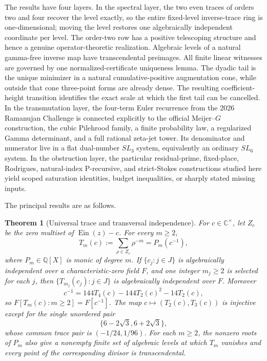 \documentclass[11pt]{article}
\theoremstyle{keio}
\newtheorem{theorem}{Theorem}[section]
\theoremstyle{definition}
\theoremstyle{remark}
\newcommand{\Q}{\mathbb Q}
\newcommand{\C}{\mathbb C}
\newcommand{\Ein}{\operatorname{Ein}}
\begin{document}
The results have four layers.  In the spectral layer, the two even traces
of orders two and four
recover the level exactly, so the entire fixed-level inverse-trace ring is
one-dimensional; moving the level restores one algebraically
independent coordinate per level.  The order-two row has a positive
telescoping structure and hence a genuine operator-theoretic realization.
Algebraic levels of a natural gamma-free inverse map have
transcendental preimages.  All finite linear witnesses are governed by
one normalized-certificate uniqueness lemma.  The dyadic tail is the
unique minimizer in a natural cumulative-positive augmentation cone, while
outside that cone three-point forms are already dense.  The resulting
coefficient-height transition identifies the exact scale at which the first
tail can be cancelled.  In the transmutation layer, the four-term Euler
recurrence from the 2026 Ramanujan Challenge is connected explicitly to the
official Meijer--\(G\) construction, the cubic Pilehrood family, a finite
probability law, a regularized Gamma determinant, and a full rational
zeta-jet tower.  Its denominator and numerator live in a flat dual-number
\(SL_3\) system, equivalently an ordinary \(SL_6\) system.  In the
obstruction layer, the particular residual-prime,
fixed-place, Rodrigues, natural-index P-recursive, and strict-Stokes
constructions studied here yield scoped saturation identities, budget
inequalities, or sharply stated missing inputs.

The principal results are as follows.

\begin{theorem}[Universal trace and transversal independence]
\label{thm:intro-universal}
For \(c\in\C^\times\), let \(Z_c\) be the zero multiset of
\(\Ein(z)-c\).  For every \(m\ge2\),
\[
 T_m(c):=\sum_{\rho\in Z_c}\rho^{-m}=P_m(c^{-1}),
\]
where \(P_m\in\Q[X]\) is monic of degree \(m\).  If
\(\{c_j:j\in J\}\) is algebraically independent over a characteristic-zero
field \(F\), and one integer \(m_j\ge2\) is selected for each \(j\), then
\(\{T_{m_j}(c_j):j\in J\}\) is algebraically independent over \(F\).
Moreover
\[
 c^{-1}=144T_4(c)-144T_2(c)^2-14T_2(c),
\]
so \(F[T_m(c):m\ge2]=F[c^{-1}]\).
The map \(c\mapsto(T_2(c),T_3(c))\) is injective except for the single
unordered pair
\[
 \{6-2\sqrt3,6+2\sqrt3\},
\]
whose common trace pair is \((-1/24,1/96)\).  For each \(m\ge2\), the
nonzero roots of \(P_m\) also give a nonempty finite set of algebraic levels
at which \(T_m\) vanishes and every point of the corresponding divisor is
transcendental.
\end{theorem}
\end{document}
